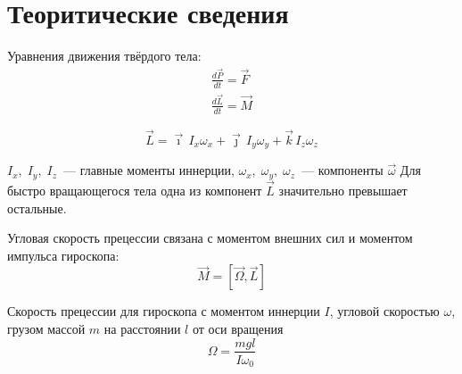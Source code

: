 \section{Теоритические сведения}
Уравнения движения твёрдого тела:
\begin{gather*}
    \frac{d\vec{P}}{dt} = \vec{F} \\
    \frac{d\vec{L}}{dt} = \vec{M}
\end{gather*}

\[
    \vec{L} = \vec{\imath}\,I_x\omega_x + 
              \vec{\jmath}\,I_y\omega_y +
              \vec{k}\,I_z\omega_z
\]

$I_x,\;I_y,\;I_z$~--- главные моменты иннерции, $\omega_x,\;\omega_y,\;\omega_z$~---
компоненты $\vec{\omega}$ Для быстро вращающегося тела одна из компонент $\vec{L}$
значительно превышает остальные.

Угловая скорость прецессии связана с моментом внешних сил и моментом импульса гироскопа:
\[\vec{M}=\left[\vec{\Omega},\vec{L}\right]\]

Скорость прецессии для гироскопа с моментом иннерции $I$, угловой скоростью $\omega$,
грузом массой $m$ на расстоянии $l$ от оси вращения
\[
    \Omega = \frac{mgl}{I\omega_0}
\]

